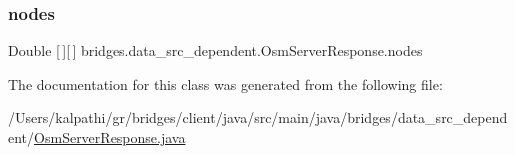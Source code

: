 \subsubsection{\texorpdfstring{nodes}{nodes}}
{\footnotesize\ttfamily Double \mbox{[}$\,$\mbox{]}\mbox{[}$\,$\mbox{]} bridges.\+data\+\_\+src\+\_\+dependent.\+Osm\+Server\+Response.\+nodes}



The documentation for this class was generated from the following file\+:\begin{DoxyCompactItemize}
\item 
/\+Users/kalpathi/gr/bridges/client/java/src/main/java/bridges/data\+\_\+src\+\_\+dependent/\mbox{\hyperlink{_osm_server_response_8java}{Osm\+Server\+Response.\+java}}\end{DoxyCompactItemize}
